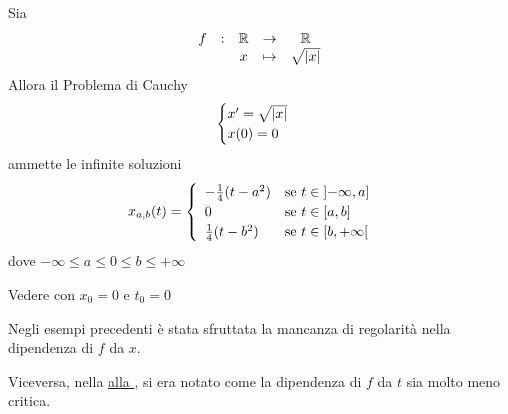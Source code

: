 \begin{example}
	Sia
	\[\begin{array}{ccccc} {f} & : & {\mathbb{R}} & \to & {\mathbb{R}} \\ & & {x} & \mapsto & {\sqrt{\left|x\right|}} \\ \end{array}\]
	Allora il Problema di Cauchy
	\begin{equation*}
		\begin{cases}
			x' = \sqrt{\left|x\right|}\\
			x(0) = 0
		\end{cases}
	\end{equation*}
	ammette le infinite soluzioni
	\begin{equation*}
		x_{a,b}(t) =
		\begin{cases}
			\begin{array}{ll}
				-\frac{1}{4}(t-a^2) & \text{se } t \in \left]-\infty,a\right]\\
				0 & \text{se } t \in \left[a,b\right]\\
				\frac{1}{4}(t-b^2) & \text{se } t \in \left[b,+\infty\right[
			\end{array}
		\end{cases}
	\end{equation*}
	dove $-\infty \leq a \leq 0 \leq b \leq +\infty$
	\begin{solution}
		Vedere  con $x_0 = 0$ e $t_0 = 0$
	\end{solution}
\end{example}
\begin{observation}
	Negli esempi precedenti è stata sfruttata la mancanza di regolarità nella dipendenza di $f$ da $x$.

	Viceversa, nella \hyperlink{note:volterra_non_cont}{\notestyle{} alla }, si era notato come la dipendenza di $f$ da $t$ sia molto meno critica.
\end{observation}
